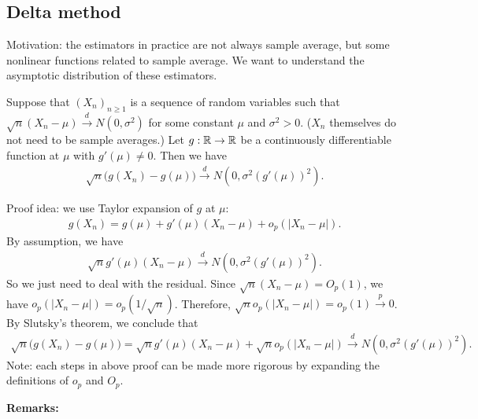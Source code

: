 \documentclass[11pt,letterpaper]{article}
\numberwithin{theorem}{lecture}
\numberwithin{proposition}{lecture}
\numberwithin{lemma}{lecture}
\numberwithin{claim}{lecture}
\numberwithin{corollary}{lecture}
\numberwithin{definition}{lecture}
\numberwithin{conjecture}{lecture}
\numberwithin{remark}{lecture}
\numberwithin{example}{lecture}
\numberwithin{equation}{lecture}
\begin{document}
\subsection{Delta method}
Motivation: the estimators in practice are not always sample average, but some nonlinear functions related to sample average. We want to understand the asymptotic distribution of these estimators.
\begin{theorem}
  Suppose that $(X_n)_{n \geq 1}$ is a sequence of random variables such that $\sqrt{n}(X_n - \mu) \xrightarrow{d} N(0, \sigma^2)$ for some constant $\mu$ and $\sigma^2 > 0$. ($X_n$ themselves do not need to be sample averages.) Let $g: \mathbb{R} \to \mathbb{R}$ be a continuously differentiable function at $\mu$ with $g'(\mu) \neq 0$. Then we have
  \begin{align*}
    \sqrt{n} \big(g(X_n) - g(\mu)\big) \xrightarrow{d} N(0, \sigma^2 (g'(\mu))^2).
  \end{align*}
\end{theorem}
Proof idea: we use Taylor expansion of $g$ at $\mu$:
\begin{align*}
  g(X_n) = g(\mu) + g'(\mu)(X_n - \mu) + o_p (|X_n - \mu|).
\end{align*}
By assumption, we have
\begin{align*}
  \sqrt{n} g'(\mu)(X_n - \mu) \xrightarrow{d} N(0, \sigma^2 (g'(\mu))^2).
\end{align*}
So we just need to deal with the residual. Since $\sqrt{n} (X_n - \mu) = O_p(1)$, we have $o_p(|X_n - \mu|) = o_p(1/\sqrt{n})$. Therefore, $\sqrt{n} o_p(|X_n - \mu|) = o_p(1) \xrightarrow{p} 0$. By Slutsky's theorem, we conclude that
\begin{align*}
  \sqrt{n} \big(g(X_n) - g(\mu)\big) = \sqrt{n} g'(\mu)(X_n - \mu) + \sqrt{n} o_p(|X_n - \mu|) \xrightarrow{d} N(0, \sigma^2 (g'(\mu))^2).
\end{align*}
Note: each steps in above proof can be made more rigorous by expanding the definitions of $o_p$ and $O_p$.

\bigskip
\noindent \textbf{Remarks:}
\end{document}
